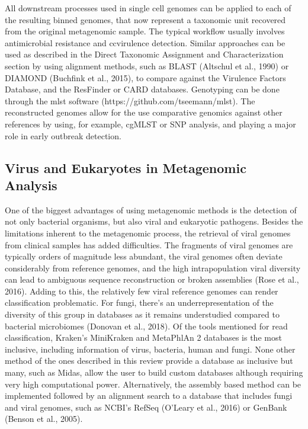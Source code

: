 All downstream processes used in single cell genomes can be applied to each of the resulting binned genomes, that now represent a taxonomic unit recovered from the original metagenomic sample. The typical workflow usually involves antimicrobial resistance and ccvirulence detection. Similar approaches can be used as described in the Direct Taxonomic Assignment and Characterization section by using alignment methods, such as BLAST (Altschul et al., 1990) or DIAMOND (Buchfink et al., 2015), to compare against the Virulence Factors Database, and the ResFinder or CARD databases. Genotyping can be done through the mlst software (https://github.com/tseemann/mlst). The reconstructed genomes allow for the use comparative genomics against other references by using, for example, cgMLST or SNP analysis, and playing a major role in early outbreak detection. 


\subsection{Virus and Eukaryotes in Metagenomic Analysis}
One of the biggest advantages of using metagenomic methods is the detection of not only bacterial organisms, but also viral and eukaryotic pathogens. 
Besides the limitations inherent to the metagenomic process, the retrieval of viral genomes from clinical samples has added difficulties. The fragments of viral genomes are typically orders of magnitude less abundant, the viral genomes often deviate considerably from reference genomes, and the high intrapopulation viral diversity can lead to ambiguous sequence reconstruction or broken assemblies (Rose et al., 2016). Adding to this, the relatively few viral reference genomes can render classification problematic. For fungi, there’s an underrepresentation of the diversity of this group in databases as it remains understudied compared to bacterial microbiomes (Donovan et al., 2018).
Of the tools mentioned for read classification, Kraken’s MiniKraken and MetaPhlAn 2 databases is the most inclusive, including information of virus, bacteria, human and fungi. None other method of the ones described in this review provide a database as inclusive but many, such as Midas, allow the user to build custom databases although requiring very high computational power. Alternatively, the assembly based method can be implemented followed by an alignment search to a database that includes fungi and viral genomes, such as NCBI’s RefSeq (O’Leary et al., 2016) or GenBank (Benson et al., 2005). 
